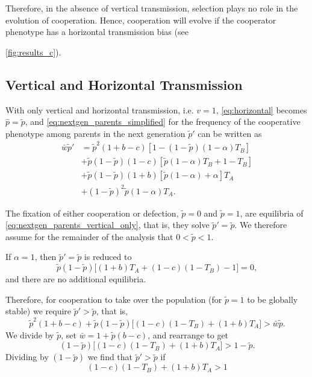 \documentclass[12pt]{extarticle}
\begin{document}
Therefore, in the absence of vertical transmission, selection plays no role in the evolution of cooperation. Hence, cooperation will evolve if the cooperator phenotype has a horizontal transmission bias (see~{\autoref{fig:results_c}).



\subsection*{Vertical and Horizontal Transmission}

With only vertical and horizontal transmission, i.e. $v=1$, \autoref{eq:horizontal} becomes
$\hat{p} =  \tilde{p}$,
and \autoref{eq:nextgen_parents_simplified} for the frequency of the cooperative phenotype among parents in the next generation $\tilde{p}'$ can be written as
\begin{equation} \label{eq:nextgen_parents_vertical_only} 
\begin{aligned}
\bar{w} \tilde{p}' 
& = \tilde{p}^2 (1+b-c) [1 - (1-\tilde{p}) (1-\alpha) T_B] \\
& + \tilde{p}(1-\tilde{p}) (1-c) [\tilde{p} (1-\alpha) T_B + 1 - T_B] \\
& + \tilde{p}(1-\tilde{p}) (1+b) [\tilde{p} (1-\alpha) + \alpha] T_A \\
& + (1-\tilde{p})^2 \tilde{p} (1-\alpha) T_A .
\end{aligned}
\end{equation}

The fixation of either cooperation or defection, 
$\tilde{p}=0$ and $ \tilde{p}=1$, are equilibria of \autoref{eq:nextgen_parents_vertical_only}, that is, they solve $\tilde{p}'= \tilde{p}$.
We therefore assume for the remainder of the analysis that $0<\tilde{p}<1$.

If $\alpha=1$, then $\tilde{p}'= \tilde{p}$ is reduced to
\begin{equation}
\tilde{p}(1-\tilde{p})\big[(1+b)T_A + (1-c)(1-T_B)-1\big] = 0,
\end{equation}
and there are no additional equilibria.

Therefore, for cooperation to take over the population (for $\tilde{p}=1$ to be globally stable) we require $\tilde{p}'>\tilde{p}$, that is,
\begin{equation}
  \tilde{p}^2 (1+b-c) + \tilde{p}(1-\tilde{p}) \big[(1-c) (1 - T_B) + (1+b)T_A\big] 
  > \bar{w}\tilde{p} .
\end{equation}
We divide by $\tilde{p}$, set $\bar{w} = 1 + \tilde{p}(b-c)$, and rearrange to get
\begin{equation}
  (1-\tilde{p}) \big[(1-c) (1 - T_B) + (1+b)T_A\big] 
  > 1 -\tilde{p} .
\end{equation}
Dividing by $(1-\tilde{p})$ we find that $\tilde{p}'>\tilde{p}$ if 
\begin{equation} \label{eq:vert_hori_alpha1_condition_proof}
  (1-c) (1 - T_B) + (1+b)T_A
  > 1
\end{equation}
\\

}
\end{document}

